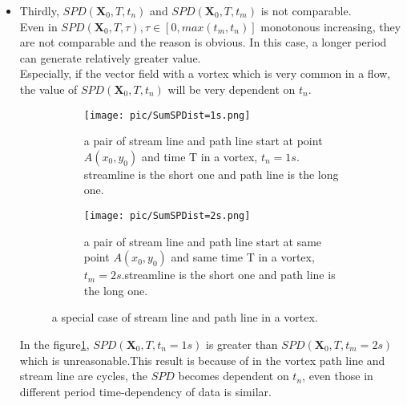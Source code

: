 \documentclass[
     11pt,         %
     a4paper,      %
     oneside,
     ]{article}
\newcommand{\vect}[1]{\boldsymbol{#1}}
\begin{document}
\begin{itemize}
    	\item Thirdly, $SPD(\vect{X}_{0},T,t_{n})$ and $SPD(\vect{X}_{0},T,t_{m})$ is not comparable.\\
    	Even in $SPD(\vect{X}_{0},T,\tau), \tau\in[0,max(t_{m},t_{n})]$ monotonous increasing, they are not comparable and the reason is obvious. In this case, a longer period can generate relatively greater value.\\
    	Especially, if the vector field with a vortex which is very common in a flow, the value of $SPD(\vect{X}_{0},T,t_{n})$ will be very dependent on $t_{n}$.
    	\begin{figure}[H]
    		\begin{subfigure}{0.45\textwidth}
    			\centering
    			\texttt{[image: pic/SumSPDist=1s.png]}
    			\caption{\tiny a pair of stream line and path line start at point $A(x_{0}, y_{0})$ and time T in a vortex, $t_{n}=1s$. streamline is the short one and path line is the long one. }
    		\end{subfigure}
    		\begin{subfigure}{0.8\textwidth}
    			\centering
    			\texttt{[image: pic/SumSPDist=2s.png]}
    			\caption{\tiny a pair of stream line and path line start at same point $A(x_{0}, y_{0})$ and same time T in a vortex, $t_{m}=2s$.streamline is the short one and path line is the long one.  }
    		\end{subfigure}
    		\caption{a special case of stream line and path line in a vortex.}
    		\label{fig:vortexstreamlineandpathline}
    	\end{figure}
    	In the figure\ref{fig:vortexstreamlineandpathline}, $SPD(\vect{X}_{0},T,t_{n}=1s)$ is greater than $SPD(\vect{X}_{0},T,t_{m}=2s)$ which is unreasonable.This result is because of in the vortex path line and stream line are cycles, the $SPD$ becomes dependent on $t_{n}$, even those in different period time-dependency of data is similar.
    \end{itemize} 
\end{document}
